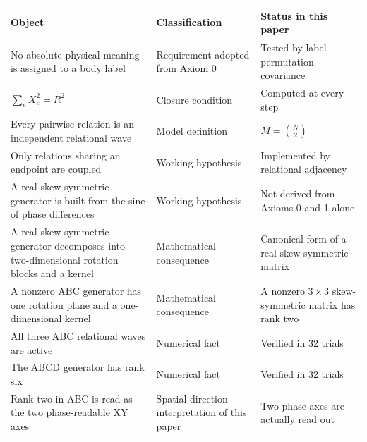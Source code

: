 \documentclass[
  10pt,
  a4paper,
]{article}
\newcounter{none} %
\begin{document}
{\def\LTcaptype{none} %
\begin{landscape}
\begingroup\scriptsize
\begin{longtable}[]{@{}
  >{\raggedright\arraybackslash}p{}
  >{\raggedright\arraybackslash}p{}
  >{\raggedright\arraybackslash}p{}@{}}
\toprule\noalign{}
\begin{minipage}[b]{\linewidth}\raggedright
Object
\end{minipage} & \begin{minipage}[b]{\linewidth}\raggedright
Classification
\end{minipage} & \begin{minipage}[b]{\linewidth}\raggedright
Status in this paper
\end{minipage} \\
\midrule\noalign{}
\endhead
\bottomrule\noalign{}
\endlastfoot
No absolute physical meaning is assigned to a body label & Requirement
adopted from Axiom 0 & Tested by label-permutation covariance \\
\(\sum_e X_e^2=R^2\) & Closure condition & Computed at every step \\
Every pairwise relation is an independent relational wave & Model
definition & \(M=\binom{N}{2}\) \\
Only relations sharing an endpoint are coupled & Working hypothesis &
Implemented by relational adjacency \\
A real skew-symmetric generator is built from the sine of phase
differences & Working hypothesis & Not derived from Axioms 0 and 1
alone \\
A real skew-symmetric generator decomposes into two-dimensional rotation
blocks and a kernel & Mathematical consequence & Canonical form of a
real skew-symmetric matrix \\
A nonzero ABC generator has one rotation plane and a one-dimensional
kernel & Mathematical consequence & A nonzero \(3\times3\)
skew-symmetric matrix has rank two \\
All three ABC relational waves are active & Numerical fact & Verified in
32 trials \\
The ABCD generator has rank six & Numerical fact & Verified in 32
trials \\
Rank two in ABC is read as the two phase-readable XY axes &
Spatial-direction interpretation of this paper & Two phase axes are
actually read out \\

\end{longtable}
\end{landscape}}
\end{document}
